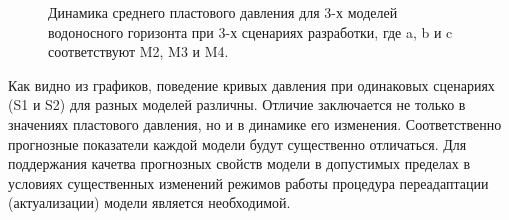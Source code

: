 \documentclass{article}
\begin{document}
\begin{figure}
{\begin{minipage}[h]{0.32\linewidth}
    \end{minipage} 
    \caption{Динамика среднего пластового давления для 3-х моделей водоносного горизонта при 3-х сценариях разработки, где a, b и c соответствуют M2, M3 и M4.}
    \label{fig:2din}
    }
\end{figure}
Как видно из графиков, поведение кривых давления при одинаковых сценариях (S1 и S2) для разных моделей различны. Отличие заключается не только в значениях пластового давления, но и в динамике его изменения. Соответственно прогнозные показатели каждой модели будут существенно отличаться. Для поддержания качетва прогнозных свойств модели в допустимых пределах в условиях существенных изменений режимов работы процедура переадаптации (актуализации) модели является необходимой.
\end{document}
